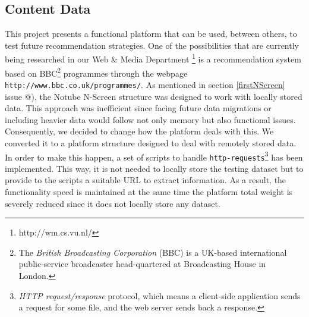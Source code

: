 \documentclass{acm_proc_article-sp}
\makeatletter
\newcommand*{\rom}[1]{\expandafter\@slowromancap\romannumeral #1@}
\makeatother
\begin{document}
\subsection{Content Data} \label{data}
This project presents a functional platform that can be used, between others, to test future recommendation strategies. One of the possibilities that are currently being researched in our Web \& Media Department \footnote{http://wm.cs.vu.nl/} is a recommendation system based on BBC\footnote{The \textit{British Broadcasting Corporation} (BBC) is a UK-based international public-service broadcaster head-quartered at Broadcasting House in London.} programmes through the webpage \texttt{http://www.bbc.co.uk/programmes/}. As mentioned in section \ref{firstNScreen} issue \rom{5}), the Notube N-Screen structure was designed to work with locally stored data. This approach was inefficient since facing future data migrations or including heavier data would follow not only memory but also functional issues. Consequently, we decided to change how the platform deals with this. We converted it to a platform structure designed to deal with remotely stored data. In order to make this happen, a set of scripts to handle \texttt{http-requests}\footnote{ \textit{HTTP request/response} protocol, which means a client-side application sends a request for some file, and the web server sends back a response.} has been implemented. This way, it is not needed to locally store the testing dataset but to provide to the scripts a suitable URL to extract information. As a result, the functionality speed is maintained at the same time the platform total weight is severely reduced since it does not locally store any dataset. 
\end{document}
